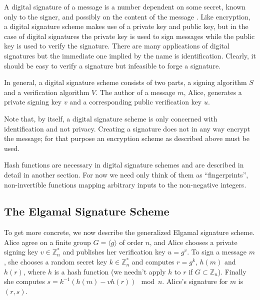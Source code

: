 \documentclass[a4paper,12pt]{article}
\begin{document}
A digital signature of a message is a number dependent on some secret, known only to the signer, and possibly on the content of the message \cite[p. 427]{menezes}. Like encryption, a digital signature scheme makes use of a private key and public key, but in the case of digital signatures the private key is used to sign messages while the public key is used to verify the signature. There are many applications of digital signatures but the immediate one implied by the name is identification. Clearly, it should be easy to verify a signature but infeasible to forge a signature.

In general, a digital signature scheme consists of two parts, a signing algorithm $S$ and a verification algorithm $V$. The author of a message $m$, Alice, generates a private signing key $v$ and a corresponding public verification key $u$.

Note that, by itself, a digital signature scheme is only concerned with identification and not privacy. Creating a signature does not in any way encrypt the message; for that purpose an encryption scheme as described above must be used.

Hash functions are necessary in digital signature schemes and are described in detail in another section. For now we need only think of them as ``fingerprints'', non-invertible functions mapping arbitrary inputs to the non-negative integers.



\subsection{The Elgamal Signature Scheme}


To get more concrete, we now describe the generalized Elgamal signature scheme. Alice agree on a finite group $G = \langle g \rangle$ of order $n$, and Alice chooses a private signing key $v \in \mathbb{Z}_n^*$ and publishes her verification key $u = g^v$. To sign a message $m$, she chooses a random secret key $k \in \mathbb{Z}_n^*$ and computes $r = g^k$, $h(m)$ and $h(r)$, where $h$ is a hash function (we needn't apply $h$ to $r$ if $G \subset \mathbb{Z}_n$). Finally she computes $s = k^{-1}(h(m)-vh(r)) \mod n$. Alice's signature for $m$ is $(r,s)$. %
\end{document}
